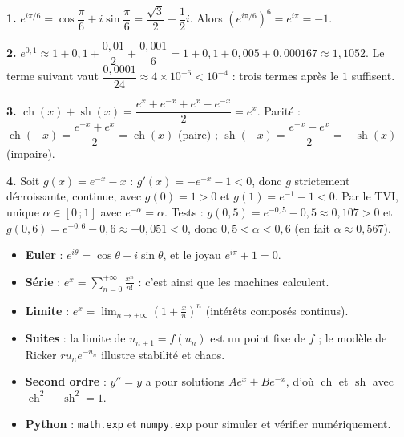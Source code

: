 \documentclass[11pt]{article}
\begin{document}
\begin{corrige}
\textbf{1.} $e^{i\pi/6}=\cos\dfrac{\pi}{6}+i\sin\dfrac{\pi}{6}=\dfrac{\sqrt{3}}{2}+\dfrac{1}{2}i$. Alors $\left(e^{i\pi/6}\right)^6=e^{i\pi}=-1$.

\textbf{2.} $e^{0,1}\approx 1+0,1+\dfrac{0,01}{2}+\dfrac{0,001}{6}=1+0,1+0,005+0,000167\approx 1,1052$. Le terme suivant vaut $\dfrac{0,0001}{24}\approx 4\times 10^{-6}<10^{-4}$ : trois termes après le $1$ suffisent.

\textbf{3.} $\operatorname{ch}(x)+\operatorname{sh}(x)=\dfrac{e^x+e^{-x}+e^x-e^{-x}}{2}=e^x$. Parité : $\operatorname{ch}(-x)=\dfrac{e^{-x}+e^{x}}{2}=\operatorname{ch}(x)$ (paire) ; $\operatorname{sh}(-x)=\dfrac{e^{-x}-e^{x}}{2}=-\operatorname{sh}(x)$ (impaire).

\textbf{4.} Soit $g(x)=e^{-x}-x$ : $g'(x)=-e^{-x}-1<0$, donc $g$ strictement décroissante, continue, avec $g(0)=1>0$ et $g(1)=e^{-1}-1<0$. Par le TVI, unique $\alpha\in[0\,;1]$ avec $e^{-\alpha}=\alpha$. Tests : $g(0,5)=e^{-0,5}-0,5\approx 0,107>0$ et $g(0,6)=e^{-0,6}-0,6\approx -0,051<0$, donc $0,5<\alpha<0,6$ (en fait $\alpha\approx 0,567$).
\end{corrige}

\begin{aretenir}
\begin{itemize}
\item \textbf{Euler} : $e^{i\theta}=\cos\theta+i\sin\theta$, et le joyau $e^{i\pi}+1=0$.
\item \textbf{Série} : $e^x=\displaystyle\sum_{n=0}^{+\infty}\frac{x^n}{n!}$ : c'est ainsi que les machines calculent.
\item \textbf{Limite} : $e^x=\displaystyle\lim_{n\to+\infty}\left(1+\frac{x}{n}\right)^n$ (intérêts composés continus).
\item \textbf{Suites} : la limite de $u_{n+1}=f(u_n)$ est un point fixe de $f$ ; le modèle de Ricker $ru_ne^{-u_n}$ illustre stabilité et chaos.
\item \textbf{Second ordre} : $y''=y$ a pour solutions $Ae^x+Be^{-x}$, d'où $\operatorname{ch}$ et $\operatorname{sh}$ avec $\operatorname{ch}^2-\operatorname{sh}^2=1$.
\item \textbf{Python} : \texttt{math.exp} et \texttt{numpy.exp} pour simuler et vérifier numériquement.
\end{itemize}
\end{aretenir}

\newpage
\end{document}
